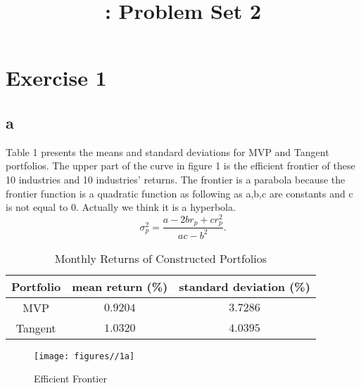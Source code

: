 \documentclass{report}
\title{\LectureTitle: Problem Set 2}
\begin{document}
\maketitle
\newpage

\section{Exercise 1}

\subsection{a}

Table 1 presents the means and standard deviations for MVP and Tangent portfolios. The upper part of the curve in figure 1 is the efficient frontier of these 10 industries and 10 industries' returns. The frontier is a parabola because the frontier function is a quadratic function as following as a,b,c are constants and c is not equal to 0. Actually we think it is a hyperbola. 
\[ \sigma_{p}^{2} = \frac{a - 2 b r_{p} + c r_{p}^{2}}{ ac - b^{2}} .\]
\begin{table}[H]
\centering
\begin{tabular}{|c|c|c|}
\hline
Portfolio&mean return (\%) &standard deviation (\%)\\
\hline
MVP& $0.9204$ & $3.7286$ \\
\hline
Tangent& $1.0320$ & $4.0395$ \\
\hline
\end{tabular}
\caption{ Monthly Returns of Constructed Portfolios}
\end{table}

\begin{figure}[H]
        \centering 
         \texttt{[image: figures//1a]}
         \caption{ Efficient Frontier}
\end{figure}
\end{document}
